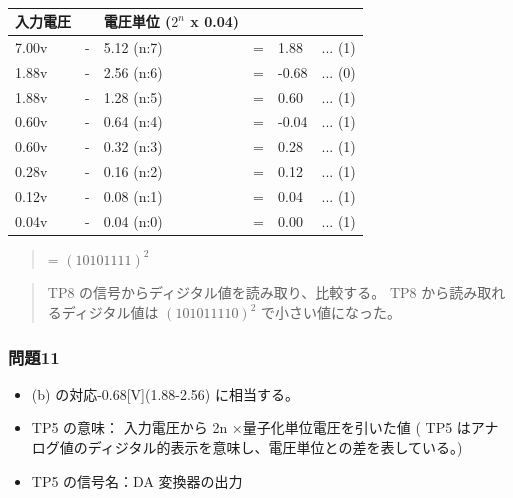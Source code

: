 \documentclass[10pt]{article}
\begin{document}
\begingroup
\setlength{\tabcolsep}{5pt} %
\renewcommand{\arraystretch}{1.5} %
\begin{table}[H]
    \centering
    \caption{}
	\begin{tabular}{|llllll|}
	    \hline
	    入力電圧 &  & 電圧単位 ($2^n$ x 0.04) &  & & \\[0.5ex]
		\hline\hline
		7.00v　& - & 5.12 (n:7) & = & 1.88 & ... (1)	 \\ \hline
		1.88v　& - & 2.56 (n:6) & = & -0.68 & ... (0)	 \\ \hline
		1.88v　& - & 1.28 (n:5) & = & 0.60 & ... (1)	 \\ \hline
		0.60v　& - & 0.64 (n:4) & = & -0.04 & ... (1)	 \\ \hline
		0.60v　& - & 0.32 (n:3) & = & 0.28 & ... (1)	 \\ \hline
		0.28v　& - & 0.16 (n:2) & = & 0.12 & ... (1)	 \\ \hline
		0.12v　& - & 0.08 (n:1) & = & 0.04 & ... (1)	 \\ \hline
		0.04v　& - & 0.04 (n:0) & = & 0.00 & ... (1)	 \\ \hline
		
	\end{tabular}
\end{table} 
\endgroup

\begin{quote}
    \centering
    = $(10101111)^2$
\end{quote}

\begin{quote}
    \centering
    TP8 の信号からディジタル値を読み取り、比較する。 TP8 から読み取れるディジタル値は $(101011110)^2$ で小さい値になった。
\end{quote}



\subsubsection{問題11}
\begin{itemize}
\centering
    \item (b) の対応-0.68[V](1.88-2.56) に相当する。 
    \item TP5 の意味： 入力電圧から 2n ×量子化単位電圧を引いた値 ( TP5 はアナログ値のディジタル的表示を意味し、電圧単位との差を表している。)
    \item TP5 の信号名：DA 変換器の出力
\end{itemize}
\end{document}
